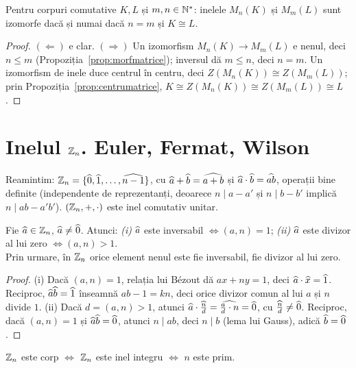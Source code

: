 \begin{corolar}\label{cor:izomatrice}
Pentru corpuri comutative $K,L$ și $m,n\in\mathbb{N}^*$: inelele $M_n(K)$ și $M_m(L)$ sunt izomorfe dacă și numai dacă $n=m$ și $K\cong L$.
\end{corolar}
\begin{proof}
$(\Leftarrow)$ e clar. $(\Rightarrow)$ Un izomorfism $M_n(K)\to M_m(L)$ e nenul, deci $n\le m$ (Propoziția~\ref{prop:morfmatrice}); inversul dă $m\le n$, deci $n=m$. Un izomorfism de inele duce centrul în centru, deci $Z(M_n(K))\cong Z(M_m(L))$; prin Propoziția~\ref{prop:centrumatrice}, $K\cong Z(M_n(K))\cong Z(M_m(L))\cong L$.
\end{proof}

\section{Inelul $\mathbb{Z}_n$. Euler, Fermat, Wilson}\label{sec:Zn}

Reamintim: $\mathbb{Z}_n=\{\widehat{0},\widehat{1},\dots,\widehat{n-1}\}$, cu $\widehat{a}+\widehat{b}=\widehat{a+b}$ și $\widehat{a}\cdot\widehat{b}=\widehat{ab}$, operații bine definite (independente de reprezentanți, deoarece $n\mid a-a'$ și $n\mid b-b'$ implică $n\mid ab-a'b'$). $(\mathbb{Z}_n,+,\cdot)$ este inel comutativ unitar.

\begin{teorema}\label{teo:Zn}
Fie $\widehat{a}\in\mathbb{Z}_n$, $\widehat{a}\neq\widehat{0}$. Atunci:
\emph{(i)} $\widehat{a}$ este inversabil $\iff(a,n)=1$;\quad
\emph{(ii)} $\widehat{a}$ este divizor al lui zero $\iff(a,n)>1$.\\
Prin urmare, în $\mathbb{Z}_n$ orice element nenul este fie inversabil, fie divizor al lui zero.
\end{teorema}

\begin{proof}
(i) Dacă $(a,n)=1$, relația lui Bézout dă $ax+ny=1$, deci $\widehat{a}\cdot\widehat{x}=\widehat{1}$. Reciproc, $\widehat{a}\widehat{b}=\widehat{1}$ înseamnă $ab-1=kn$, deci orice divizor comun al lui $a$ și $n$ divide $1$.
(ii) Dacă $d=(a,n)>1$, atunci $\widehat{a}\cdot\widehat{\tfrac nd}=\widehat{\tfrac ad\cdot n}=\widehat{0}$, cu $\widehat{\tfrac nd}\neq\widehat{0}$. Reciproc, dacă $(a,n)=1$ și $\widehat{a}\widehat{b}=\widehat{0}$, atunci $n\mid ab$, deci $n\mid b$ (lema lui Gauss), adică $\widehat{b}=\widehat{0}$.
\end{proof}

\begin{corolar}\label{cor:Zpcorp}
$\mathbb{Z}_n$ este corp $\iff$ $\mathbb{Z}_n$ este inel integru $\iff$ $n$ este prim.
\end{corolar}

